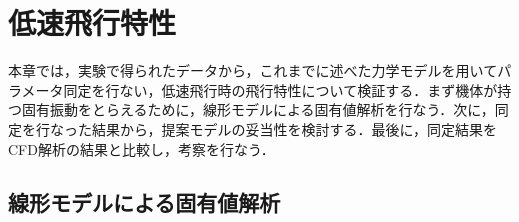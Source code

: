 
\chapter{低速飛行特性}
\label{flight_char}

本章では，実験で得られたデータから，これまでに述べた力学モデルを用いてパラメータ同定を行ない，低速飛行時の飛行特性について検証する．まず機体が持つ固有振動をとらえるために，線形モデルによる固有値解析を行なう．次に，同定を行なった結果から，提案モデルの妥当性を検討する．最後に，同定結果をCFD解析の結果と比較し，考察を行なう．

\section{線形モデルによる固有値解析}
\label{sec:analyze}

